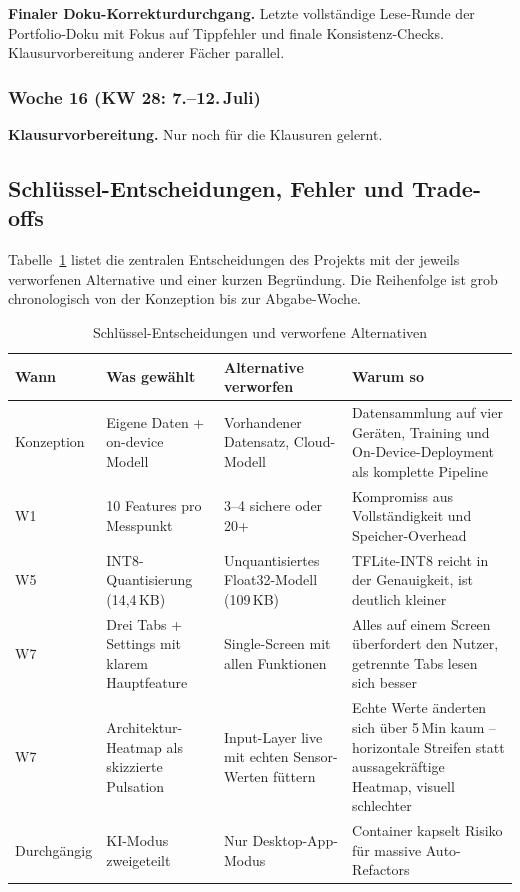 \documentclass[12pt, a4paper, ngerman]{article}
\begin{document}
\textbf{Finaler Doku-Korrekturdurchgang.}
Letzte vollständige Lese-Runde der Portfolio-Doku mit Fokus auf
Tippfehler und finale Konsistenz-Checks. Klausurvorbereitung
anderer Fächer parallel.

\subsubsection*{Woche 16 (KW 28: 7.--12.\,Juli)}

\textbf{Klausurvorbereitung.}
Nur noch für die Klausuren gelernt.

\newpage

\subsection{Schlüssel-Entscheidungen, Fehler und Trade-offs}
\label{sec:entscheidungen}

Tabelle~\ref{tab:entscheidungen} listet die zentralen Entscheidungen
des Projekts mit der jeweils verworfenen Alternative und einer
kurzen Begründung. Die Reihenfolge ist grob chronologisch von der
Konzeption bis zur Abgabe-Woche.

\begin{table}[H]
\centering
\small
\renewcommand{\arraystretch}{1.4}
\caption{Schlüssel-Entscheidungen und verworfene Alternativen}
\label{tab:entscheidungen}
\begin{tabular}{p{2.2cm}p{4.2cm}p{4.2cm}p{4.0cm}}
\toprule
\textbf{Wann} & \textbf{Was gewählt} & \textbf{Alternative verworfen} & \textbf{Warum so} \\
\midrule
Konzeption & Eigene Daten + on-device Modell &
  Vorhandener Datensatz, Cloud-Modell &
  Datensammlung auf vier Geräten, Training und On-Device-Deployment als komplette Pipeline \\
W1 & 10 Features pro Messpunkt &
  3--4 \glqq{}sichere\grqq{} oder 20+ &
  Kompromiss aus Vollständigkeit und Speicher-Overhead \\
W5 & INT8-Quantisierung (14,4\,KB) &
  Unquantisiertes Float32-Modell (109\,KB) &
  TFLite-INT8 reicht in der Genauigkeit, ist deutlich kleiner \\
W7 & Drei Tabs + Settings mit klarem Hauptfeature &
  Single-Screen mit allen Funktionen &
  Alles auf einem Screen überfordert den Nutzer, getrennte Tabs lesen sich besser \\
W7 & Architektur-Heatmap als skizzierte Pulsation &
  Input-Layer live mit echten Sensor-Werten füttern &
  Echte Werte änderten sich über 5\,Min kaum -- horizontale Streifen statt aussagekräftige Heatmap, visuell schlechter \\
Durchgängig & KI-Modus zweigeteilt &
  Nur Desktop-App-Modus &
  Container kapselt Risiko für massive Auto-Refactors \\
\bottomrule
\end{tabular}
\end{table}
\end{document}
